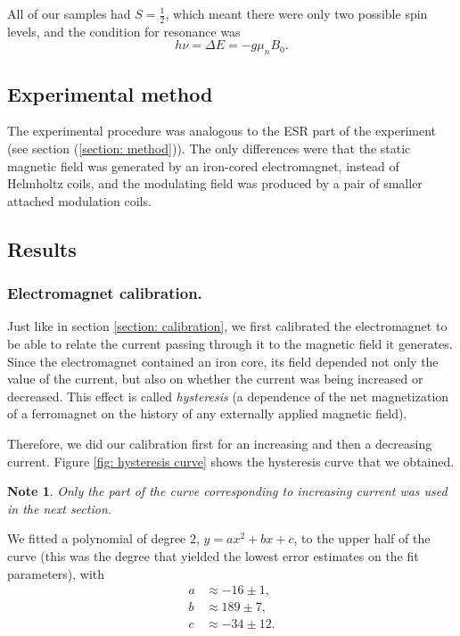 \documentclass[a4paper]{jpconf}
\numberwithin{equation}{section}
\newtheorem*{note}{Note}
\begin{document}
All of our samples had $S = \tfrac{1}{2}$, which meant there were only two possible spin levels, and the condition for resonance was 
\begin{equation}\label{eqn: NMR resonance condition}
	h\nu = \Delta E = -g \mu_n B_0.
\end{equation}


\subsection{Experimental method}
The experimental procedure was analogous to the ESR part of the experiment (see section (\ref{section: method})). The only differences were that the static magnetic field was generated by an iron-cored electromagnet, instead of Helmholtz coils, and the modulating field was produced by a pair of smaller attached modulation coils.


\subsection{Results}
\subsubsection{Electromagnet calibration.}
Just like in section \ref{section: calibration}, we first calibrated the electromagnet to be able to relate the current passing through it to the magnetic field it generates. Since the electromagnet contained an iron core, its field depended not only the value of the current, but also on whether the current was being increased or decreased. This effect is called \emph{hysteresis} (a dependence of the net magnetization of a ferromagnet on the history of any externally applied magnetic field). 

Therefore, we did our calibration first for an increasing and then a decreasing current. Figure \ref{fig: hysteresis curve} shows the hysteresis curve that we obtained.
\begin{note}
	Only the part of the curve corresponding to increasing current was used in the next section.
\end{note}
We fitted a polynomial of degree $2$, $y = ax^2 + bx + c$, to the upper half of the curve (this was the degree that yielded the lowest error estimates on the fit parameters), with
\begin{align*}
	a &\approx -16 \pm 1, \\
	b &\approx 189 \pm 7, \\
	c &\approx -34 \pm 12.
\end{align*}
\end{document}
